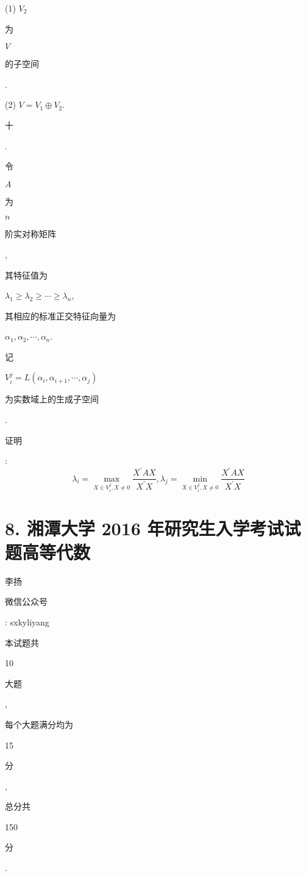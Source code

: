 \documentclass[10pt]{article}
\begin{document}
(1) $V_{2}$ \begin{CJK}{UTF8}{mj}为\end{CJK} $V$ \begin{CJK}{UTF8}{mj}的子空间\end{CJK}.

(2) $V=V_{1} \oplus V_{2}$.

\begin{CJK}{UTF8}{mj}十\end{CJK}. \begin{CJK}{UTF8}{mj}令\end{CJK} $A$ \begin{CJK}{UTF8}{mj}为\end{CJK} $n$ \begin{CJK}{UTF8}{mj}阶实对称矩阵\end{CJK}, \begin{CJK}{UTF8}{mj}其特征值为\end{CJK} $\lambda_{1} \geqslant \lambda_{2} \geqslant \cdots \geqslant \lambda_{n}$, \begin{CJK}{UTF8}{mj}其相应的标准正交特征向量为\end{CJK} $\alpha_{1}, \alpha_{2}, \cdots, \alpha_{n}$. \begin{CJK}{UTF8}{mj}记\end{CJK} $V_{i}^{j}=L\left(\alpha_{i}, \alpha_{i+1}, \cdots, \alpha_{j}\right)$ \begin{CJK}{UTF8}{mj}为实数域上的生成子空间\end{CJK}. \begin{CJK}{UTF8}{mj}证明\end{CJK}:
$$
\lambda_{i}=\max _{X \in V_{i}^{j}, X \neq 0} \frac{X^{\prime} A X}{X^{\prime} X}, \lambda_{j}=\min _{X \in V_{i}^{j}, X \neq 0} \frac{X^{\prime} A X}{X^{\prime} X}
$$

\section{8. 湘潭大学 2016 年研究生入学考试试题高等代数}
\begin{CJK}{UTF8}{mj}李扬\end{CJK}

\begin{CJK}{UTF8}{mj}微信公众号\end{CJK}: sxkyliyang

\begin{CJK}{UTF8}{mj}本试题共\end{CJK} 10 \begin{CJK}{UTF8}{mj}大题\end{CJK}, \begin{CJK}{UTF8}{mj}每个大题满分均为\end{CJK} 15 \begin{CJK}{UTF8}{mj}分\end{CJK}, \begin{CJK}{UTF8}{mj}总分共\end{CJK} 150 \begin{CJK}{UTF8}{mj}分\end{CJK}.
\end{document}
